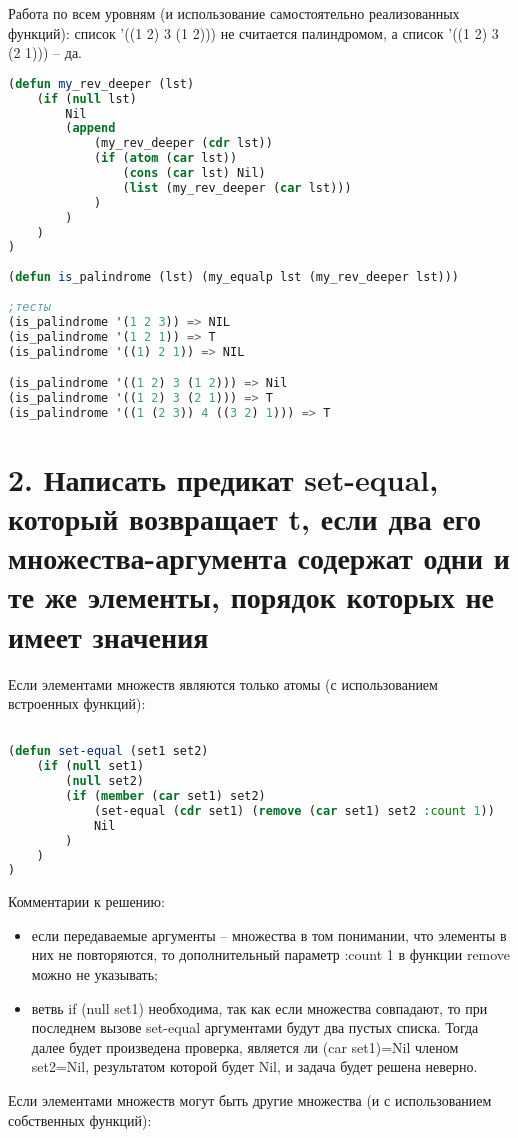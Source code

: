 \documentclass[12pt]{report}
\begin{document}
\clearpage
Работа по всем уровням (и использование самостоятельно реализованных функций): список '((1 2) 3 (1 2))) не считается палиндромом, а список '((1 2) 3 (2 1))) -- да.

\begin{lstlisting}[language=Lisp]	
(defun my_rev_deeper (lst) 
	(if (null lst) 
		Nil 
		(append 
			(my_rev_deeper (cdr lst))
			(if (atom (car lst)) 	
				(cons (car lst) Nil)
				(list (my_rev_deeper (car lst)))
			)
		)
	)
)
	
(defun is_palindrome (lst) (my_equalp lst (my_rev_deeper lst)))
	
;тесты
(is_palindrome '(1 2 3)) => NIL
(is_palindrome '(1 2 1)) => T
(is_palindrome '((1) 2 1)) => NIL

(is_palindrome '((1 2) 3 (1 2))) => Nil
(is_palindrome '((1 2) 3 (2 1))) => T
(is_palindrome '((1 (2 3)) 4 ((3 2) 1))) => T
\end{lstlisting}

\section*{2. Написать предикат set-equal, который возвращает t, если два его множества-аргумента содержат одни и те же элементы, порядок которых не имеет значения}

Если элементами множеств являются только атомы (с использованием встроенных функций):

\begin{lstlisting}[language=Lisp]	

(defun set-equal (set1 set2)
	(if (null set1)  
		(null set2)
		(if (member (car set1) set2) 
			(set-equal (cdr set1) (remove (car set1) set2 :count 1))
			Nil
		)
	)
)
\end{lstlisting}

Комментарии к решению:
\begin{itemize}
	\item если передаваемые аргументы -- множества в том понимании, что элементы в них не повторяются, то дополнительный параметр :count 1 в функции remove можно не указывать;
	\item ветвь if (null set1) необходима, так как если множества совпадают, то при последнем вызове set-equal аргументами будут два пустых списка. Тогда далее будет произведена проверка, является ли (car set1)=Nil членом set2=Nil, результатом которой будет Nil, и задача будет решена неверно.
\end{itemize}


Если элементами множеств могут быть другие множества (и с использованием собственных функций):
\end{document}
